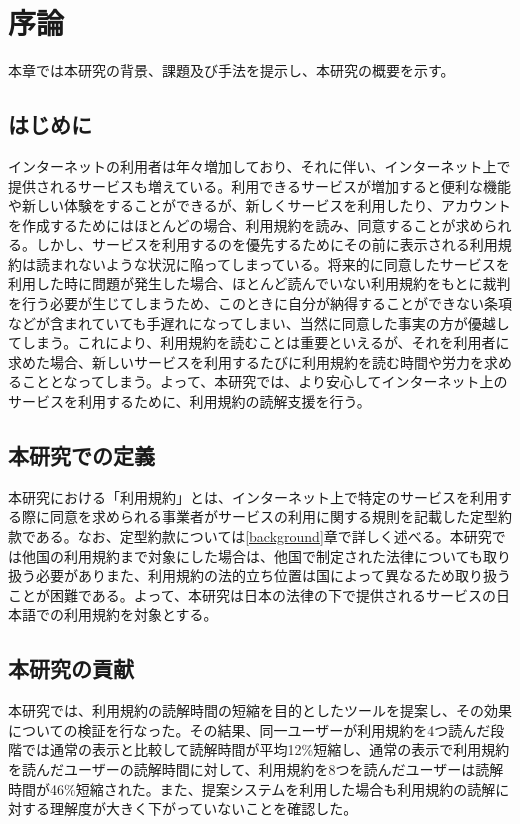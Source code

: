 \chapter{序論}
\label{introduction}

本章では本研究の背景、課題及び手法を提示し、本研究の概要を示す。

\section{はじめに}
\label{introduction:background}
インターネットの利用者は年々増加しており、それに伴い、インターネット上で提供されるサービスも増えている。利用できるサービスが増加すると便利な機能や新しい体験をすることができるが、新しくサービスを利用したり、アカウントを作成するためにはほとんどの場合、利用規約を読み、同意することが求められる。しかし、サービスを利用するのを優先するためにその前に表示される利用規約は読まれないような状況に陥ってしまっている。将来的に同意したサービスを利用した時に問題が発生した場合、ほとんど読んでいない利用規約をもとに裁判を行う必要が生じてしまうため、このときに自分が納得することができない条項などが含まれていても手遅れになってしまい、当然に同意した事実の方が優越してしまう。これにより、利用規約を読むことは重要といえるが、それを利用者に求めた場合、新しいサービスを利用するたびに利用規約を読む時間や労力を求めることとなってしまう。よって、本研究では、より安心してインターネット上のサービスを利用するために、利用規約の読解支援を行う。

\section{本研究での定義}
本研究における「利用規約」とは、インターネット上で特定のサービスを利用する際に同意を求められる事業者がサービスの利用に関する規則を記載した定型約款である。なお、定型約款については\ref{background}章で詳しく述べる。本研究では他国の利用規約まで対象にした場合は、他国で制定された法律についても取り扱う必要がありまた、利用規約の法的立ち位置は国によって異なるため取り扱うことが困難である。よって、本研究は日本の法律の下で提供されるサービスの日本語での利用規約を対象とする。

\section{本研究の貢献}
本研究では、利用規約の読解時間の短縮を目的としたツールを提案し、その効果についての検証を行なった。その結果、同一ユーザーが利用規約を4つ読んだ段階では通常の表示と比較して読解時間が平均12\%短縮し、通常の表示で利用規約を読んだユーザーの読解時間に対して、利用規約を8つを読んだユーザーは読解時間が46\%短縮された。また、提案システムを利用した場合も利用規約の読解に対する理解度が大きく下がっていないことを確認した。

